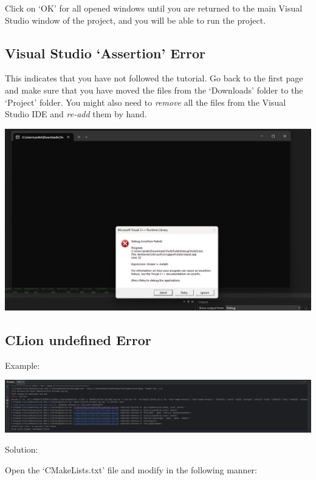 \documentclass[../en-fa-lab.tex]{subfiles}
\begin{document}
Click on `OK' for all opened windows until you are returned to the main
Visual Studio window of the project, and you will be able to run the
project.

\subsection{Visual Studio `Assertion'
Error}\label{visual-studio-assertion-error}

This indicates that you have not followed the tutorial. Go back to the
first page and make sure that you have moved the files from the
`Downloads' folder to the `Project' folder. You might also need to
\emph{remove} all the files from the Visual Studio IDE and \emph{re-add}
them by hand.

\includegraphics[width=\textwidth,alt={A screenshot of a computer Description automatically generated}]{./Resources/tutorial_lab9/image15.png}

\subsection{CLion undefined Error}\label{clion-undefined-error}

Example:

\includegraphics[width=\textwidth,alt={A screen shot of a computer Description automatically generated}]{./Resources/tutorial_lab9/image16.png}

Solution:

Open the `CMakeLists.txt' file and modify in the following manner:
\end{document}
